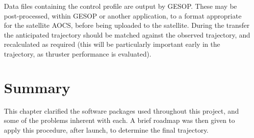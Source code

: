 Data files containing the control profile are output by GESOP. These may be post-processed, within GESOP or another application, to a format appropriate for the satellite AOCS, before being uploaded to the satellite. During the transfer the anticipated trajectory should be matched against the observed trajectory, and recalculated as required (this will be particularly important early in the trajectory, as thruster performance is evaluated).

\section{Summary} \label{sec:Method-summary}

This chapter clarified the software packages used throughout this project, and some of the problems inherent with each. A brief roadmap was then given to apply this procedure, after launch, to determine the final trajectory.

  
\clearpage